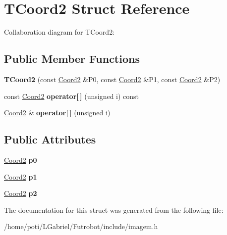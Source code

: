 \hypertarget{structTCoord2}{}\section{T\+Coord2 Struct Reference}
\label{structTCoord2}


Collaboration diagram for T\+Coord2\+:
\subsection*{Public Member Functions}
\begin{DoxyCompactItemize}
\item 
{\bfseries T\+Coord2} (const \hyperlink{structCoord2}{Coord2} \&P0, const \hyperlink{structCoord2}{Coord2} \&P1, const \hyperlink{structCoord2}{Coord2} \&P2)\hypertarget{structTCoord2_a8988173568e459daa91f4a80d54efb07}{}\label{structTCoord2_a8988173568e459daa91f4a80d54efb07}

\item 
const \hyperlink{structCoord2}{Coord2} {\bfseries operator\mbox{[}$\,$\mbox{]}} (unsigned i) const \hypertarget{structTCoord2_a9d0b2b243086fd2decf38f12a2a3f9a8}{}\label{structTCoord2_a9d0b2b243086fd2decf38f12a2a3f9a8}

\item 
\hyperlink{structCoord2}{Coord2} \& {\bfseries operator\mbox{[}$\,$\mbox{]}} (unsigned i)\hypertarget{structTCoord2_a563e578b29ce217a620530460316e542}{}\label{structTCoord2_a563e578b29ce217a620530460316e542}

\end{DoxyCompactItemize}
\subsection*{Public Attributes}
\begin{DoxyCompactItemize}
\item 
\hyperlink{structCoord2}{Coord2} {\bfseries p0}\hypertarget{structTCoord2_a598f50d8aab66e95df913d26b5da00c3}{}\label{structTCoord2_a598f50d8aab66e95df913d26b5da00c3}

\item 
\hyperlink{structCoord2}{Coord2} {\bfseries p1}\hypertarget{structTCoord2_a9db436cd1690d47c26f642ae681d8d92}{}\label{structTCoord2_a9db436cd1690d47c26f642ae681d8d92}

\item 
\hyperlink{structCoord2}{Coord2} {\bfseries p2}\hypertarget{structTCoord2_af7ff83453d0155a6140af57013ac37ff}{}\label{structTCoord2_af7ff83453d0155a6140af57013ac37ff}

\end{DoxyCompactItemize}


The documentation for this struct was generated from the following file\+:\begin{DoxyCompactItemize}
\item 
/home/poti/\+L\+Gabriel/\+Futrobot/include/imagem.\+h\end{DoxyCompactItemize}
